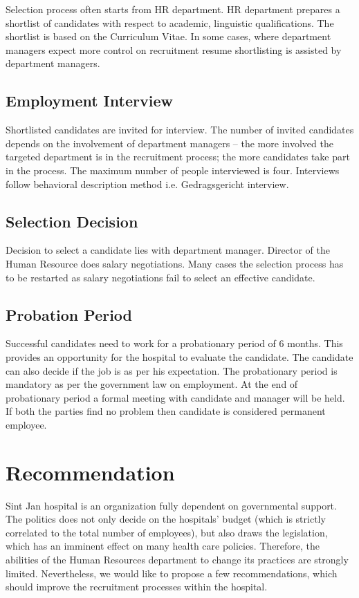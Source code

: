 \documentclass[a4paper,fleqn,11pt,dvips,titlepage]{article}
\numberwithin{figure}{section}
\numberwithin{equation}{section}
\begin{document}
Selection process often starts from HR department.
HR department prepares a shortlist of candidates with respect to academic, linguistic qualifications.
The shortlist is based on the Curriculum Vitae.
In some cases, where department managers expect more control on recruitment resume shortlisting is assisted by department managers. 

\subsection{Employment Interview}

Shortlisted candidates are invited for interview.
The number of invited candidates depends on the involvement of department managers – the more involved the targeted department is in the recruitment process; the more candidates take part in the process.
The maximum number of people interviewed is four.
Interviews follow behavioral description method i.e. Gedragsgericht interview. 

\subsection{Selection Decision}

Decision to select a candidate lies with department manager.
Director of the Human Resource does salary negotiations.
Many cases the selection process has to be restarted as salary negotiations fail to select an effective candidate.


\subsection{Probation Period}

Successful candidates need to work for a probationary period of 6 months.
This provides an opportunity for the hospital to evaluate the candidate.
The candidate can also decide if the job is as per his expectation.
The probationary period is mandatory as per the government law on employment.
At the end of probationary period a formal meeting with candidate and manager will be held.
If both the parties find no problem then candidate is considered permanent employee.


\section{Recommendation}

Sint Jan hospital is an organization fully dependent on governmental support.
The politics does not only decide on the hospitals’ budget (which is strictly correlated to the total number of employees),
but also draws the legislation, which has an imminent effect on many health care policies.
Therefore, the abilities of the Human Resources department to change its practices are strongly limited.
Nevertheless, we would like to propose a few recommendations, which should improve the recruitment processes within the hospital. 
\end{document}
